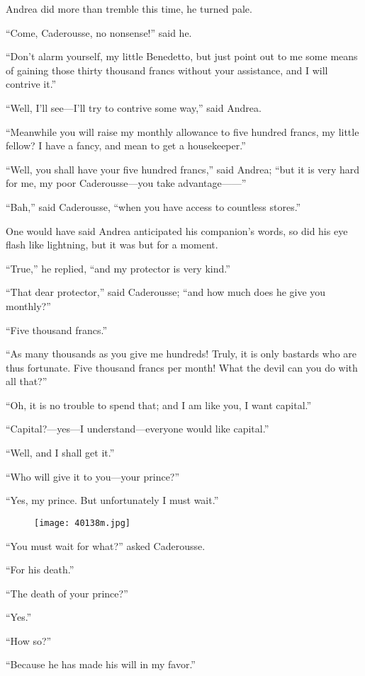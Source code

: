 Andrea did more than tremble this time, he turned pale.

“Come, Caderousse, no nonsense!” said he.

“Don’t alarm yourself, my little Benedetto, but just point out to me
some means of gaining those thirty thousand francs without your
assistance, and I will contrive it.”

“Well, I’ll see—I’ll try to contrive some way,” said Andrea.

“Meanwhile you will raise my monthly allowance to five hundred francs,
my little fellow? I have a fancy, and mean to get a housekeeper.”

“Well, you shall have your five hundred francs,” said Andrea; “but it
is very hard for me, my poor Caderousse—you take advantage——”

“Bah,” said Caderousse, “when you have access to countless stores.”

One would have said Andrea anticipated his companion’s words, so did
his eye flash like lightning, but it was but for a moment.

“True,” he replied, “and my protector is very kind.”

“That dear protector,” said Caderousse; “and how much does he give you
monthly?”

“Five thousand francs.”

“As many thousands as you give me hundreds! Truly, it is only bastards
who are thus fortunate. Five thousand francs per month! What the devil
can you do with all that?”

“Oh, it is no trouble to spend that; and I am like you, I want
capital.”

“Capital?—yes—I understand—everyone would like capital.”

“Well, and I shall get it.”

“Who will give it to you—your prince?”

“Yes, my prince. But unfortunately I must wait.”

\begin{figure}[ht]
\texttt{[image: 40138m.jpg]}
\end{figure}

“You must wait for what?” asked Caderousse.

“For his death.”

“The death of your prince?”

“Yes.”

“How so?”

“Because he has made his will in my favor.”

